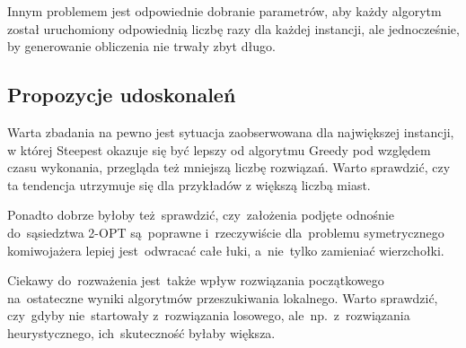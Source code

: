 Innym problemem jest odpowiednie dobranie parametrów, aby każdy algorytm został uruchomiony odpowiednią liczbę razy dla każdej instancji, ale jednocześnie, by generowanie obliczenia nie trwały zbyt długo.

\subsection{Propozycje udoskonaleń}

Warta zbadania na pewno jest sytuacja zaobserwowana dla największej instancji, w której Steepest okazuje się być lepszy od algorytmu Greedy pod względem czasu wykonania, przegląda też mniejszą liczbę rozwiązań. Warto sprawdzić, czy ta tendencja utrzymuje się dla przykładów z większą liczbą miast.

Ponadto dobrze byłoby też~sprawdzić, czy~założenia podjęte odnośnie do~sąsiedztwa 2-OPT są~poprawne i~rzeczywiście dla~problemu symetrycznego komiwojażera lepiej jest~odwracać całe łuki, a~nie~tylko zamieniać wierzchołki.

Ciekawy do~rozważenia jest~także wpływ rozwiązania początkowego na~ostateczne wyniki algorytmów przeszukiwania lokalnego. Warto sprawdzić, czy~gdyby nie~startowały z~rozwiązania losowego, ale~np.~z~rozwiązania heurystycznego, ich~skuteczność byłaby większa.